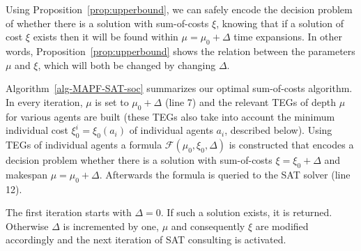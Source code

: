 \documentclass[jair,oneside,11pt]{article}
\begin{document}
\vspace{0.25cm}

Using Proposition~\ref{prop:upperbound}, we can safely encode the decision problem of whether there is a solution with sum-of-costs $\xi$, knowing that if a solution of cost $\xi$ exists then it will be found within $\mu=\mu_0+\Delta$ time expansions. In other words, Proposition~\ref{prop:upperbound} shows the relation between the parameters $\mu$ and $\xi$, which will both be changed by changing $\Delta$.


Algorithm~\ref{alg-MAPF-SAT-soc} summarizes our optimal sum-of-costs algorithm. In every iteration, $\mu$ is set to $\mu_0+\Delta$ (line 7) and the relevant TEGs of depth $\mu$ for various agents are built (these TEGs also take into account the minimum individual cost $\xi^i_0 = \xi_0(a_i)$ of individual agents $a_i$, described below). Using TEGs of individual agents a formula  $\mathcal{F}(\mu_0, \xi_0, \Delta)$ is constructed that encodes a decision problem whether there is a solution with sum-of-costs $\xi=\xi_0 + \Delta$ and makespan $\mu = \mu_0 + \Delta$. Afterwards the formula is queried to the SAT solver (line 12).

The first iteration starts with $\Delta=0$. If such a solution exists, it is returned. Otherwise $\Delta$ is incremented by one, $\mu$ and consequently $\xi$ are modified accordingly and the next iteration of SAT consulting is activated.
\end{document}
